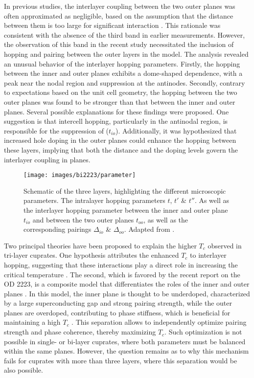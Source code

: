 In previous studies, the interlayer coupling between the two outer planes was often approximated as negligible, based on the assumption that the distance between them is too large for significant interaction \cite{kunisada_observation_2017,ideta_hybridization_2021}.
This rationale was consistent with the absence of the third band in earlier measurements.
However, the observation of this band in the recent study \cite{luo_electronic_2023} necessitated the inclusion of hopping and pairing between the outer layers in the model.
The analysis revealed an unusual behavior of the interlayer hopping parameters.
Firstly, the hopping between the inner and outer planes exhibits a dome-shaped dependence, with a peak near the nodal region and suppression at the antinodes.
Secondly, contrary to expectations based on the unit cell geometry, the hopping between the two outer planes was found to be stronger than that between the inner and outer planes.
Several possible explanations for these findings were proposed.
One suggestion is that intercell hopping, particularly in the antinodal region, is responsible for the suppression of ($t_{io}$).
Additionally, it was hypothesized that increased hole doping in the outer planes could enhance the hopping between these layers, implying that both the distance and the doping levels govern the interlayer coupling in  planes.

\begin{figure}
	\centering
	\texttt{[image: images/bi2223/parameter]}
	\caption{Schematic of the three  layers, highlighting the different microscopic parameters. The intralayer hopping parameters $t$, $t'$ \& $t''$. As well as the interlayer hopping parameter between the inner and outer plane $t_{io}$ and between the two outer planes $t_{oo}$, as well as the corresponding pairings $\Delta_{io}$ \& $\Delta_{oo}$. Adapted from \cite{luo_electronic_2023}.}
	\label{fig:parameter}
\end{figure}


Two principal theories have been proposed to explain the higher $T_c$ observed in tri-layer cuprates.
One hypothesis attributes the enhanced $T_c$ to interlayer hopping, suggesting that these interactions play a direct role in increasing the critical temperature \cite{chakravarty_explanation_2004,nishiguchi_superconductivity_2013}.
The second, which is favored by the recent report on the OD 2223, is a composite model that differentiates the roles of the inner and outer planes \cite{kivelson_making_2002,berg_route_2008,okamoto_enhanced_2008}.
In this model, the inner plane is thought to be underdoped, characterized by a large superconducting gap and strong pairing strength, while the outer planes are overdoped, contributing to phase stiffness, which is beneficial for maintaining a high $T_c$ \cite{emery_importance_1995}.
This separation allows to independently optimize pairing strength and phase coherence, thereby maximizing $T_c$.
Such optimization is not possible in single- or bi-layer cuprates, where both parameters must be balanced within the same planes.
However, the question remains as to why this mechanism fails for cuprates with more than three  layers, where this separation would be also possible.


